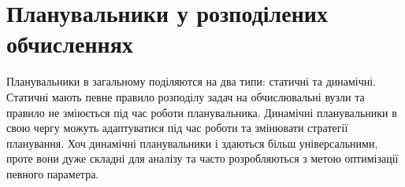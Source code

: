 \section{Планувальники у розподілених обчисленнях}

Планувальники в загальному поділяются на два типи: статичні та динамічні. Статичні мають певне правило розподілу задач на обчислювальні вузли та правило не зміюється під час роботи планувальника. Динамічні планувальники в свою чергу можуть адаптуватися під час роботи та змінювати стратегії планування. Хоч динамічні планувальники і здаються більш універсальними, проте вони дуже складні для аналізу та часто розробляються з метою оптимізації певного параметра.